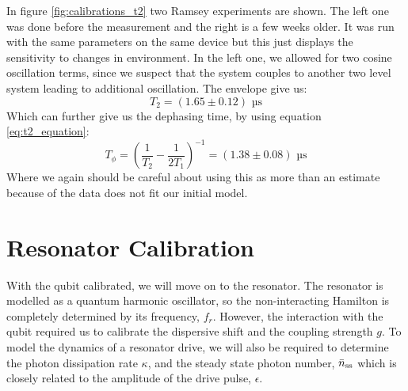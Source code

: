 In figure \ref{fig:calibrations_t2} two Ramsey experiments are shown. The left one was done before the measurement and the right is a few weeks older. It was run with the same parameters on the same device but this just displays the sensitivity to changes in environment. In the left one, we allowed for two cosine oscillation terms, since we suspect that the system couples to another two level system leading to additional oscillation. The envelope give us:
\begin{equation}
    T_2 = (1.65 \pm 0.12) \text{ µs} 
\end{equation}
Which can further give us the dephasing time, by using equation \ref{eq:t2_equation}:
\begin{equation}
    T_\phi = \left(\frac{1}{T_2} - \frac{1}{2T_1} \right)^{-1} = (1.38 \pm 0.08) \text{ µs}
\end{equation}
Where we again should be careful about using this as more than an estimate because of the data does not fit our initial model. 




\section{Resonator Calibration}
With the qubit calibrated, we will move on to the resonator. The resonator is modelled as a quantum harmonic oscillator, so the non-interacting Hamilton is completely determined by its frequency, $f_r$. However, the interaction with the qubit required us to calibrate the dispersive shift and the coupling strength $g$. To model the dynamics of a resonator drive, we will also be required to determine the photon dissipation rate $\kappa$, and the steady state photon number, $\Bar{n}_{\text{ss}}$ which is closely related to the amplitude of the drive pulse, $\epsilon$.

